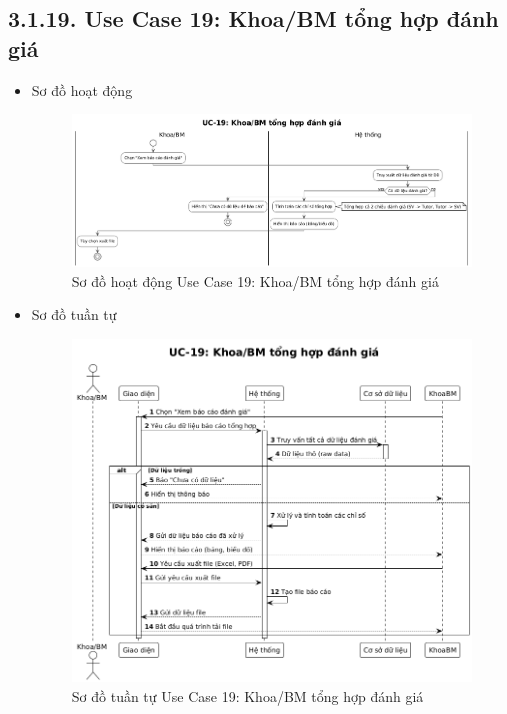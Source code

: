 \subsection*{3.1.19. Use Case 19: Khoa/BM tổng hợp đánh giá}
\begin{itemize}
    \item Sơ đồ hoạt động
    \begin{figure}[H]
    \centering
    \includegraphics[scale=0.35 ]{Picture/ACUC19.png}
    \caption{Sơ đồ hoạt động Use Case 19: Khoa/BM tổng hợp đánh giá}
    \end{figure}
    \item Sơ đồ tuần tự
    \begin{figure}[H]
    \centering
    \includegraphics[scale=0.45 ]{Picture/SEUC19.png}
    \caption{Sơ đồ tuần tự Use Case 19: Khoa/BM tổng hợp đánh giá}
    \end{figure}
\end{itemize}
